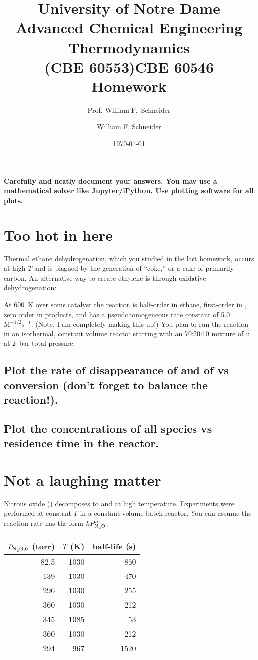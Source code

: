 \documentclass[11pt]{article}
\title{University of Notre Dame\\Advanced Chemical Engineering Thermodynamics\\(CBE 60553)}
\author{Prof. William F.\ Schneider}
\author{William F. Schneider}
\date{\today}
\title{CBE 60546 Homework}
\begin{document}
\begin{OPTIONS}
\end{OPTIONS}

\noindent \textbf{Carefully and neatly document your answers.  You may use a mathematical solver like Jupyter/iPython. Use plotting software for all plots.}

\section{Too hot in here}
\label{sec:org86e0c98}
Thermal ethane dehydrogenation, which you studied in the last homework, occurs at high \(T\) and is plagued by the generation of ``coke,'' or a cake of primarily carbon. An alternative way to create ethylene is through oxidative dehydrogenation:
\begin{center}
\end{center}
\noindent At \SI{600}{K} over some catalyst the reaction is half-order in ethane, first-order in , zero order in products, and has a pseudohomogeneous rate constant of 5.0 \(\text{M}^{-1/2}\text{s}^{-1}\). (Note, I am completely making this up!) You plan to run the reaction in an isothermal, constant volume reactor starting with an 70:20:10 mixture of :: at \SI{2}{bar} total pressure.

\subsection{Plot the rate of disappearance of  and of  vs  conversion (don't forget to balance the reaction!).}
\label{sec:orge3bd349}

\subsection{Plot the concentrations of all species vs residence time in the reactor.}
\label{sec:orgdbc7d8a}

\section{Not a laughing matter}
\label{sec:org408b57e}
Nitrous oxide () decomposes to  and  at high temperature. Experiments were performed at constant \(T\) in a constant volume batch reactor. You can assume the reaction rate has the form \(k P_{\ce{N2O}}^a\).

\begin{center}
\begin{tabular}{rrr}
\hline
\(P_{\ce{N2O},0}\) (torr) & \(T\) (K) & half-life (s)\\
\hline
82.5 & 1030 & 860\\
139 & 1030 & 470\\
296 & 1030 & 255\\
360 & 1030 & 212\\
345 & 1085 & 53\\
360 & 1030 & 212\\
294 & 967 & 1520\\
\hline
\end{tabular}
\end{center}
\end{document}
